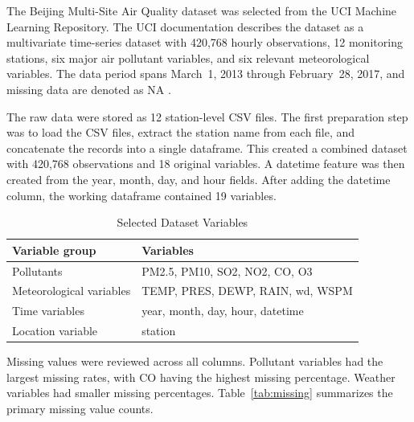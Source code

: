 \documentclass[stu,12pt,floatsintext]{apa7}
\begin{document}
The Beijing Multi-Site Air Quality dataset was selected from the UCI Machine Learning
Repository. The UCI documentation describes the dataset as a multivariate time-series
dataset with 420,768 hourly observations, 12 monitoring stations, six major air pollutant
variables, and six relevant meteorological variables. The data period spans March~1, 2013
through February~28, 2017, and missing data are denoted as NA \parencite{Chen2017}.

The raw data were stored as 12 station-level CSV files. The first preparation step was to
load the CSV files, extract the station name from each file, and concatenate the records
into a single dataframe. This created a combined dataset with 420,768 observations and
18 original variables. A datetime feature was then created from the year, month, day, and
hour fields. After adding the datetime column, the working dataframe contained 19
variables.

\begin{table}[H]
  \begin{threeparttable}
  \caption{Selected Dataset Variables}
  \label{tab:variables}
  \begin{tabular}{ll}
    \toprule
    \textbf{Variable group}      & \textbf{Variables}                     \\
    \midrule
    Pollutants                   & PM2.5, PM10, SO2, NO2, CO, O3          \\
    Meteorological variables     & TEMP, PRES, DEWP, RAIN, wd, WSPM       \\
    Time variables               & year, month, day, hour, datetime        \\
    Location variable            & station                                 \\
    \bottomrule
  \end{tabular}
  \end{threeparttable}
\end{table}

Missing values were reviewed across all columns. Pollutant variables had the largest
missing rates, with CO having the highest missing percentage. Weather variables had
smaller missing percentages. Table~\ref{tab:missing} summarizes the primary missing value
counts.
\end{document}
